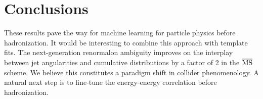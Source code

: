\section{Conclusions}\label{sec:conclusions}

These results pave the way for machine learning for particle physics
before hadronization. It would be interesting to combine this approach
with template fits. The next-generation renormalon ambiguity improves on
the interplay between jet angularities and cumulative distributions by a
factor of 2 in the $\overline{\rm MS}$ scheme. We believe this
constitutes a paradigm shift in collider phenomenology. A natural next
step is to fine-tune the energy-energy correlation before hadronization.

